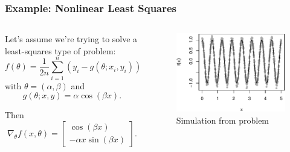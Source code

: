 \documentclass[aspectratio=1610,onlytextwidth]{beamer}
\begin{document}
\begin{frame}[c]
  \frametitle{Example: Nonlinear Least Squares}

  \begin{columns}
    \begin{column}{0.42\textwidth}
      Let's assume we're trying to solve a least-squares type of problem:
      $$f(\theta) = \frac{1}{2n} \sum_{i=1}^n  \left(y_i - g(\theta; x_i, y_i)\right)^2$$
      with $\theta = (\alpha, \beta)$ and
      $$g(\theta; x, y) = \alpha \cos(\beta x).$$

      \bigskip\pause

      Then
      \[
        \nabla_{\theta} f(x, \theta) =
        \begin{bmatrix}
          \cos(\beta x) \\ - \alpha x \sin(\beta x)
        \end{bmatrix}.
      \]
    \end{column}
    \begin{column}{0.5\textwidth}
      \begin{figure}[htpb]
        \centering
        \includegraphics[]{images/nonlinear-data.pdf}
        \caption{%
          Simulation from problem
        }
      \end{figure}
    \end{column}
  \end{columns}
\end{frame}
\end{document}
